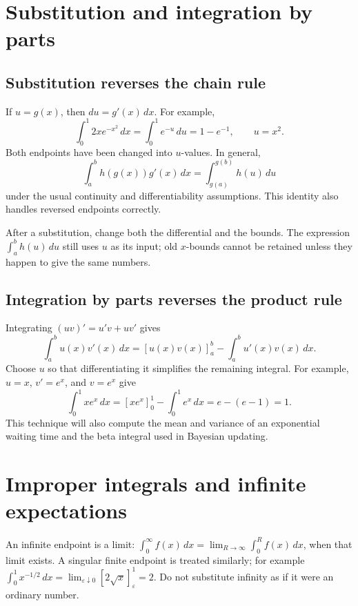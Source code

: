 \section{Substitution and integration by parts}
\label{sec:calc-techniques}

\subsection*{Substitution reverses the chain rule}
If $u=g(x)$, then $du=g'(x)\,dx$. For example,
\[
 \int_0^1 2x e^{-x^2}\,dx
 =\int_0^1 e^{-u}\,du=1-e^{-1},\qquad u=x^2.
\]
Both endpoints have been changed into $u$-values. In general,
\[
 \int_a^b h(g(x))g'(x)\,dx
 =\int_{g(a)}^{g(b)}h(u)\,du
\]
under the usual continuity and differentiability assumptions.
This identity also handles reversed endpoints correctly.

\begin{warningbox}
After a substitution, change both the differential and the bounds.
The expression $\int_a^b h(u)\,du$ still uses $u$ as its input; old
$x$-bounds cannot be retained unless they happen to give the same numbers.
\end{warningbox}

\subsection*{Integration by parts reverses the product rule}
Integrating $(uv)'=u'v+uv'$ gives
\[
 \int_a^b u(x)v'(x)\,dx
 =[u(x)v(x)]_a^b-\int_a^b u'(x)v(x)\,dx.
\]
Choose $u$ so that differentiating it simplifies the remaining integral.
For example, $u=x$, $v'=e^x$, and $v=e^x$ give
\[
 \int_0^1 xe^x\,dx=[xe^x]_0^1-\int_0^1e^x\,dx
 =e-(e-1)=1.
\]
This technique will also compute the mean and variance of an exponential
waiting time and the beta integral used in Bayesian updating.

\section{Improper integrals and infinite expectations}
\label{sec:calc-improper}

An infinite endpoint is a limit:
$\int_0^\infty f(x)\,dx=\lim_{R\to\infty}\int_0^R f(x)\,dx$,
when that limit exists. A singular finite endpoint is treated similarly;
for example $\int_0^1 x^{-1/2}\,dx=\lim_{\varepsilon\downarrow0}
[2\sqrt{x}]_{\varepsilon}^1=2$.
Do not substitute infinity as if it were an ordinary number.


